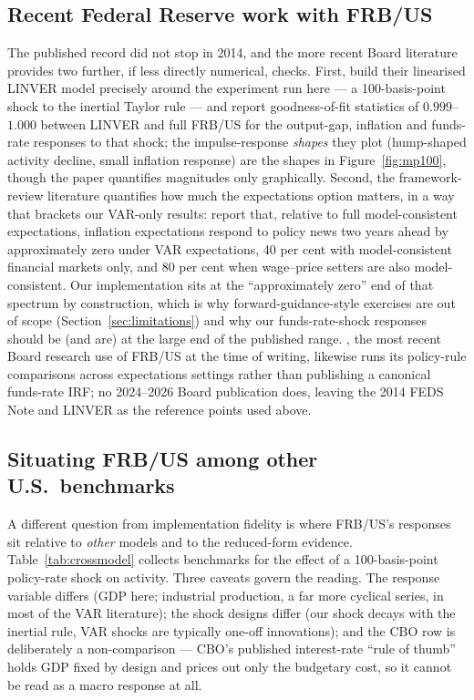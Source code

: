 \subsection{Recent Federal Reserve work with FRB/US}
\label{sec:cmp-recent}

The published record did not stop in 2014, and the more recent Board literature provides two further, if less directly numerical, checks. First, \citet{brayton2022linver} build their linearised LINVER model precisely around the experiment run here --- a 100-basis-point shock to the inertial Taylor rule --- and report goodness-of-fit statistics of $0.999$--$1.000$ between LINVER and full FRB/US for the output-gap, inflation and funds-rate responses to that shock; the impulse-response \emph{shapes} they plot (hump-shaped activity decline, small inflation response) are the shapes in Figure~\ref{fig:mp100}, though the paper quantifies magnitudes only graphically. Second, the framework-review literature quantifies how much the expectations option matters, in a way that brackets our VAR-only results: \citet{hebden2020makeup} report that, relative to full model-consistent expectations, inflation expectations respond to policy news two years ahead by approximately zero under VAR expectations, 40 per cent with model-consistent financial markets only, and 80 per cent when wage--price setters are also model-consistent. Our implementation sits at the ``approximately zero'' end of that spectrum by construction, which is why forward-guidance-style exercises are out of scope (Section~\ref{sec:limitations}) and why our funds-rate-shock responses should be (and are) at the large end of the published range. \citet{kiley2025anchoring}, the most recent Board research use of FRB/US at the time of writing, likewise runs its policy-rule comparisons across expectations settings rather than publishing a canonical funds-rate IRF; no 2024--2026 Board publication does, leaving the 2014 FEDS Note and LINVER as the reference points used above.

\subsection{Situating FRB/US among other U.S.\ benchmarks}
\label{sec:cmp-crossmodel}

A different question from implementation fidelity is where FRB/US's responses sit relative to \emph{other} models and to the reduced-form evidence. Table~\ref{tab:crossmodel} collects benchmarks for the effect of a 100-basis-point policy-rate shock on activity. Three caveats govern the reading. The response variable differs (GDP here; industrial production, a far more cyclical series, in most of the VAR literature); the shock designs differ (our shock decays with the inertial rule, VAR shocks are typically one-off innovations); and the CBO row is deliberately a non-comparison --- CBO's published interest-rate ``rule of thumb'' holds GDP fixed by design and prices out only the budgetary cost, so it cannot be read as a macro response at all.

